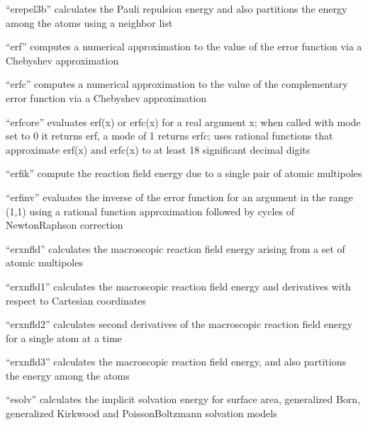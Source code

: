 \documentclass[letterpaper,11pt,english]{sphinxmanual}
\begin{document}
“erepel3b” calculates the Pauli repulsion energy and also
partitions the energy among the atoms using a neighbor list


“erf” computes a numerical approximation to the value of
the error function via a Chebyshev approximation


“erfc” computes a numerical approximation to the value of the
complementary error function via a Chebyshev approximation


“erfcore” evaluates erf(x) or erfc(x) for a real argument x;
when called with mode set to 0 it returns erf, a mode of 1
returns erfc; uses rational functions that approximate erf(x)
and erfc(x) to at least 18 significant decimal digits


“erfik” compute the reaction field energy due to a single pair
of atomic multipoles


“erfinv” evaluates the inverse of the error function for
an argument in the range (\sphinxhyphen{}1,1) using a rational function
approximation followed by cycles of Newton\sphinxhyphen{}Raphson correction


“erxnfld” calculates the macroscopic reaction field energy
arising from a set of atomic multipoles


“erxnfld1” calculates the macroscopic reaction field energy
and derivatives with respect to Cartesian coordinates


“erxnfld2” calculates second derivatives of the macroscopic
reaction field energy for a single atom at a time


“erxnfld3” calculates the macroscopic reaction field energy,
and also partitions the energy among the atoms


“esolv” calculates the implicit solvation energy for surface area,
generalized Born, generalized Kirkwood and Poisson\sphinxhyphen{}Boltzmann
solvation models
\end{document}
